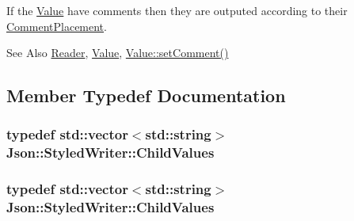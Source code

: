 If the \hyperlink{classJson_1_1Value}{Value} have comments then they are outputed according to their \hyperlink{namespaceJson_a4fc417c23905b2ae9e2c47d197a45351}{Comment\-Placement}.

\begin{DoxySeeAlso}{See Also}
\hyperlink{classJson_1_1Reader}{Reader}, \hyperlink{classJson_1_1Value}{Value}, \hyperlink{classJson_1_1Value_a29f3a30f7e5d3af6f38d57999bf5b480}{Value\-::set\-Comment()} 
\end{DoxySeeAlso}


\subsection{Member Typedef Documentation}
\hypertarget{classJson_1_1StyledWriter_a0b102abcd4b7e11eb22df63921e097df}{
\subsubsection[{Child\-Values}]{\setlength{\rightskip}{0pt plus 5cm}typedef std\-::vector$<$std\-::string$>$ {\bf Json\-::\-Styled\-Writer\-::\-Child\-Values}\hspace{0.3cm}{\ttfamily [private]}}}\label{d8/d76/classJson_1_1StyledWriter_a0b102abcd4b7e11eb22df63921e097df}
\hypertarget{classJson_1_1StyledWriter_a0b102abcd4b7e11eb22df63921e097df}{
\subsubsection[{Child\-Values}]{\setlength{\rightskip}{0pt plus 5cm}typedef std\-::vector$<$std\-::string$>$ {\bf Json\-::\-Styled\-Writer\-::\-Child\-Values}\hspace{0.3cm}{\ttfamily [private]}}}\label{d8/d76/classJson_1_1StyledWriter_a0b102abcd4b7e11eb22df63921e097df}


